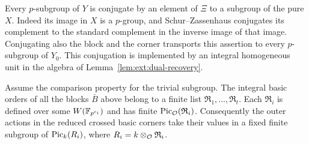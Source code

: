 Every $p$-subgroup of $Y$ is conjugate by an element of $\Xi$ to a
subgroup of the pure $X$.  Indeed its image in $X$ is a $p$-group,
and Schur--Zassenhaus conjugates its complement to the standard
complement in the inverse image of that image.  Conjugating also
the block and the corner transports this assertion to every
$p$-subgroup of $Y_0$.  This conjugation is implemented by an
integral homogeneous unit in the algebra of
Lemma~\ref{lem:ext:dual-recovery}.

\begin{lemma}
\label{lem:ext:integral-bases}
Assume the comparison property for the trivial subgroup.  The
integral basic orders of all the blocks $\bar B$ above belong to a
finite list $\mathfrak R_1,\ldots,\mathfrak R_t$.  Each
$\mathfrak R_i$ is defined over some $W(\mathbb F_{p^{c_i}})$ and has finite
$\operatorname{Pic}_{\mathcal O}(\mathfrak R_i)$.  Consequently the outer actions in
the reduced crossed basic corners take their values in a fixed
finite subgroup of $\operatorname{Pic}_k(R_i)$, where
$R_i=k\otimes_{\mathcal O}\mathfrak R_i$.
\end{lemma}

